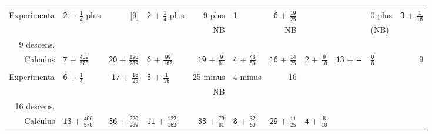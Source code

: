 {\begin{tabular}{r|lr|lr|lr|lr|lr}
& & & & & & & & & & 
\\
\textsf{Experimenta}
& 
\textsf{$ \textsf{2 + }\displaystyle\frac{\textsf{1}}{\textsf{4}} $ plus}
& 
\textsf{[9]} %
& 
\textsf{$ \textsf{2 + }\displaystyle\frac{\textsf{1}}{\textsf{4}} $ plus}
& 
\textsf{9 plus}
& 
\textsf{1}
& 
\textsf{$ \textsf{6 + }\displaystyle\frac{\textsf{19}}{\textsf{25}} $}
& 
& 
& 
\textsf{0 plus}
& 
\textsf{$ \textsf{3 + }\displaystyle\frac{\textsf{1}}{\textsf{16}} $}
\\
& & & & NB & & NB & & & (NB) &
\\
\hline
%
%
\rule[0mm]{0mm}{4mm}%
\textsf{9 descens.}
& & & & & & & & & & 
\\
\textsf{Calculus}
& 
\textsf{$ \textsf{7 + }\displaystyle\frac{\textsf{409}}{\textsf{578}} $}
& 
\textsf{$ \textsf{20 + }\displaystyle\frac{\textsf{196}}{\textsf{289}} $}
& 
\textsf{$ \textsf{6 + }\displaystyle\frac{\textsf{99}}{\textsf{162}} $}
& 
\textsf{$ \textsf{19 + }\displaystyle\frac{\textsf{9}}{\textsf{81}} $}
& 
\textsf{$ \textsf{4 + }\displaystyle\frac{\textsf{43}}{\textsf{50}} $}
& 
\textsf{$ \textsf{16 + }\displaystyle\frac{\textsf{14}}{\textsf{25}} $}
& 
\textsf{$ \textsf{2 + }\displaystyle\frac{\textsf{9}}{\textsf{18}} $}
& 
\textsf{$ \textsf{13 + }\displaystyle\frac{\phantom{m}}{\phantom{m}} $}
& 
\textsf{$ \displaystyle\frac{\textsf{0}}{\textsf{8}} $}
& 
\textsf{9}
\\
& & & & & & & & & & 
\\
\textsf{Experimenta}
& 
\textsf{$ \textsf{6 + }\displaystyle\frac{\textsf{1}}{\textsf{4}} $}
& 
\textsf{$ \textsf{17 + }\displaystyle\frac{\textsf{16}}{\textsf{25}} $}
& 
\textsf{$ \textsf{5 + }\displaystyle\frac{\textsf{1}}{\textsf{16}} $}
& 
\textsf{25 minus}
& 
\textsf{4 minus}
& 
\textsf{16}
& 
& 
& 
& 
\\
& & & & NB & & & & & & 
\\
\hline
%
%
\rule[0mm]{0mm}{4mm}%
\textsf{16 descens.}
& & & & & & & & & &
\\
\textsf{Calculus}
& 
\textsf{$ \textsf{13 + }\displaystyle\frac{\textsf{406}}{\textsf{578}} $}
& 
\textsf{$ \textsf{36 + }\displaystyle\frac{\textsf{220}}{\textsf{289}} $}
& 
\textsf{$ \textsf{11 + }\displaystyle\frac{\textsf{122}}{\textsf{162}} $}
& 
\textsf{$ \textsf{33 + }\displaystyle\frac{\textsf{79}}{\textsf{81}} $}
& 
\textsf{$ \textsf{8 + }\displaystyle\frac{\textsf{32}}{\textsf{50}} $}
& 
\textsf{$ \textsf{29 + }\displaystyle\frac{\textsf{11}}{\textsf{25}} $}
& 
\textsf{$ \textsf{4 + }\displaystyle\frac{\textsf{8}}{\textsf{18}} $}

\end{tabular}}
